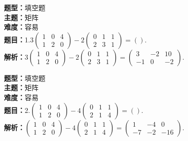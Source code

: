 \documentclass{ctexart}
\newenvironment{question}[5]{%
	\noindent\textbf{题型：}#1\\
	\textbf{主题：}#2\\
	\textbf{难度：}#3\\
	\textbf{题目：}#4\\
	\textbf{解析：}#5\\
	\vspace{1em}
}{}
\begin{document}
	\begin{question}
		{填空题}
		{矩阵}
		{容易}
		{1.\(3\left(\begin{array}{lll}1 & 0 & 4 \\ 1 & 2 & 0\end{array}\right)-2\left(\begin{array}{lll}0 & 1 & 1 \\ 2 & 3 & 1\end{array}\right)=()\).}
		{\(3\left(\begin{array}{lll}1 & 0 & 4 \\ 1 & 2 & 0\end{array}\right)-2\left(\begin{array}{lll}0 & 1 & 1 \\ 2 & 3 & 1\end{array}\right)=\left(\begin{array}{ccc}3 & -2 & 10 \\ -1 & 0 & -2\end{array}\right)\).}
	\end{question}
	
	\begin{question}
		{填空题}
		{矩阵}
		{容易}
		{2.\(\left(\begin{array}{lll}1 & 0 & 4 \\ 1 & 2 & 0\end{array}\right)-4\left(\begin{array}{lll}0 & 1 & 1 \\ 2 & 1 & 4\end{array}\right)=()\).}
		{\(\left(\begin{array}{lll}1 & 0 & 4 \\ 1 & 2 & 0\end{array}\right)-4\left(\begin{array}{lll}0 & 1 & 1 \\ 2 & 1 & 4\end{array}\right)=\left(\begin{array}{ccc}1 & -4 & 0 \\ -7 & -2 & -16\end{array}\right)\).}
	\end{question}
	
\end{document}
